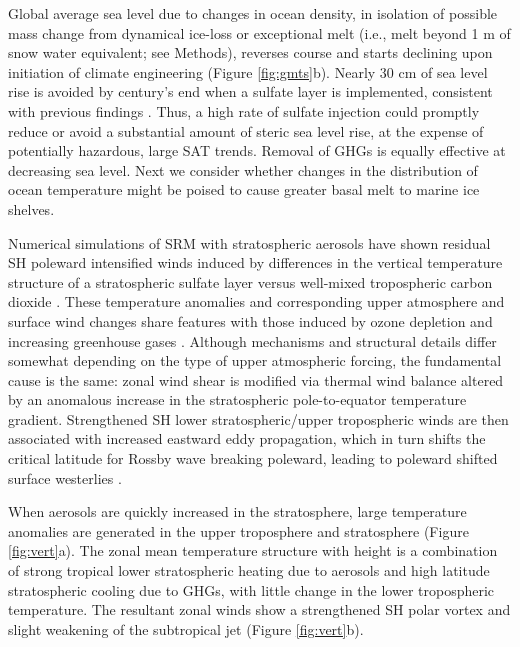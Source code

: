 \documentclass{nature}
\begin{document}
Global average sea level due to changes in ocean density, in isolation of possible mass change from dynamical ice-loss or exceptional melt (i.e., melt beyond 1 m of snow water equivalent; see Methods), reverses course and starts declining upon initiation of climate engineering (Figure \ref{fig:gmts}b). Nearly 30 cm of sea level rise is avoided by century's end when a sulfate layer is implemented, consistent with previous findings \cite{irvine12}. Thus, a high rate of sulfate injection could promptly reduce or avoid a substantial amount of steric sea level rise, at the expense of potentially hazardous, large SAT trends. Removal of GHGs is equally effective at decreasing sea level. Next we consider whether changes in the distribution of ocean temperature might be poised to cause greater basal melt to marine ice shelves. 

Numerical simulations of SRM with stratospheric aerosols have shown residual SH poleward intensified winds induced by differences in the vertical temperature structure of a stratospheric sulfate layer versus well-mixed tropospheric carbon dioxide \cite{ammann10,mccusker12}. These temperature anomalies and corresponding upper atmosphere and surface wind changes share features with those induced by ozone depletion \cite{gillett03,gillett13,sigmond11,thompson11} and increasing greenhouse gases \cite{gillett13,sigmond11,polvani11}. Although mechanisms and structural details differ somewhat depending on the type of upper atmospheric forcing, the fundamental cause is the same: zonal wind shear is modified via thermal wind balance altered by an anomalous increase in the stratospheric pole-to-equator temperature gradient. Strengthened SH lower stratospheric/upper tropospheric winds are then associated with increased eastward eddy propagation, which in turn shifts the critical latitude for Rossby wave breaking poleward, leading to poleward shifted surface westerlies \cite{chen07}.

When aerosols are quickly increased in the stratosphere, large temperature anomalies are generated in the upper troposphere and stratosphere (Figure \ref{fig:vert}a). The zonal mean temperature structure with height is a combination of strong tropical lower stratospheric heating due to aerosols \cite{ferraro11} and high latitude stratospheric cooling due to GHGs, with little change in the lower tropospheric temperature. The resultant zonal winds show a strengthened SH polar vortex and slight weakening of the subtropical jet (Figure \ref{fig:vert}b). 
\end{document}
